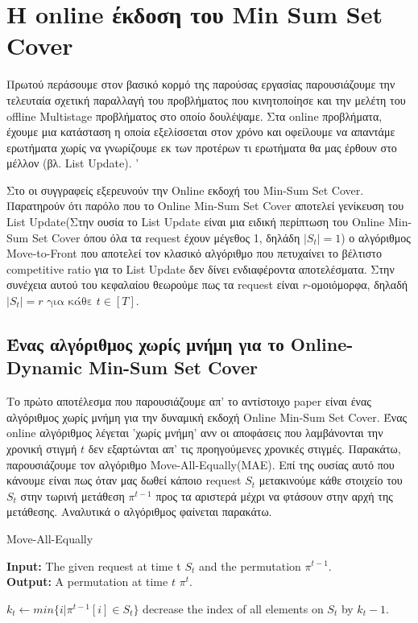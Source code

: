 \section{Η online έκδοση του Min Sum Set Cover}

Πρωτού περάσουμε στον βασικό κορμό της παρούσας εργασίας παρουσιάζουμε την τελευταία σχετική παραλλαγή του προβλήματος που κινητοποίησε και την μελέτη του offline Multistage προβλήματος στο οποίο δουλέψαμε. Στα online προβλήματα, έχουμε μια κατάσταση η οποία εξελίσσεται στον χρόνο και οφείλουμε να απαντάμε ερωτήματα χωρίς να γνωρίζουμε εκ των προτέρων τι ερωτήματα θα μας έρθουν στο μέλλον (βλ. List Update). '

Στο \cite{FKKSV20} οι συγγραφείς εξερευνούν την Online εκδοχή του Min-Sum Set Cover. Παρατηρούν ότι παρόλο που το Online Min-Sum Set Cover αποτελεί γενίκευση του List Update(Στην ουσία το List Update είναι μια ειδική περίπτωση του Online Min-Sum Set Cover όπου όλα τα request έχουν μέγεθος 1, δηλάδη $|S_t| = 1$) ο αλγόριθμος Move-to-Front που αποτελεί τον κλασικό αλγόριθμο που πετυχαίνει το βέλτιστο competitive ratio για το List Update δεν δίνει ενδιαφέροντα αποτελέσματα. Στην συνέχεια αυτού του κεφαλαίου θεωρούμε πως τα request είναι $r$-ομοιόμορφα, δηλαδή $|S_t| = r \text{ για κάθε } t \in [T]$.

\subsection{Ένας αλγόριθμος χωρίς μνήμη για το Online-Dynamic Min-Sum Set Cover}

Το πρώτο αποτέλεσμα που παρουσιάζουμε απ' το αντίστοιχο paper είναι ένας αλγόριθμος χωρίς μνήμη για την δυναμική εκδοχή Online Min-Sum Set Cover. Ένας online αλγόριθμος λέγεται 'χωρίς μνήμη' ανν οι αποφάσεις που λαμβάνονται την χρονική στιγμή $t$ δεν εξαρτώνται απ' τις προηγούμενες χρονικές στιγμές. Παρακάτω, παρουσιάζουμε τον αλγόριθμο Move-All-Equally(MAE). Επί της ουσίας αυτό που κάνουμε είναι πως όταν μας δωθεί κάποιο request $S_t$ μετακινούμε κάθε στοιχείο του $S_t$ στην τωρινή μετάθεση $\pi^{t-1}$ προς τα αριστερά μέχρι να φτάσουν στην αρχή της μετάθεσης. Αναλυτικά ο αλγόριθμος φαίνεται παρακάτω.

\begin{algorithm}[ht]
  \caption{Move-All-Equally}
  \textbf{Input:} The given request at time t $S_t$ and the permutation $\pi^{t-1}$.\\
  \textbf{Output:} A permutation at time $t$ $\pi^t$.

 \begin{algorithmic}[1]
    \STATE $k_t \leftarrow min\{ i | \pi^{t-1} [ i ] \in S_t \}$
    \STATE decrease the index of all elements on $S_t$ by $k_t - 1$.

  \end{algorithmic}
\end{algorithm}

